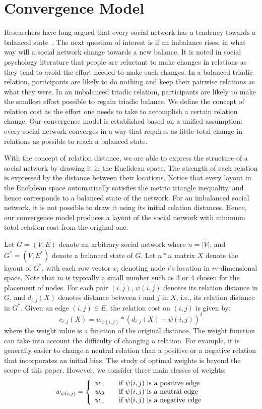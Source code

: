 \documentclass[acmtweb]{acmsmall}
\begin{document}
\section{Convergence Model} \label{sec:mathmodel}
Researchers have long argued that every social network has a tendency
towards a balanced state~\cite{Doreian:02}.  The next question of
interest is if an imbalance rises, in what way will a social network
change towards a new balance.  It is noted in social psychology
literature that people are reluctant to make changes in relations as
they tend to avoid the effort needed to make such changes. In a balanced
triadic relation, participants are likely to do nothing and keep their
pairwise relations as what they were. In an imbalanced triadic
relation, participants are likely to make the smallest effort possible
to regain triadic balance. We define the concept of relation cost as
the effort one needs to take to accomplish a certain relation
change. Our convergence model is established based on a unified
assumption: every social network converges in a way that requires as
little total change in relations as possible to reach a balanced
state.

With the concept of relation distance, we are able to express the
structure of a social network by drawing it in the Euclidean
space. The strength of each relation is expressed by the distance
between their locations. Notice that every layout in the Euclidean
space automatically satisfies the metric triangle inequality, and
hence corresponds to a balanced state of the network.  For an
imbalanced social network, it is not possible to draw it using its
initial relation distances.  Hence, our convergence model produces a
layout of the social network with minimum total relation cost from the
original one.

Let $G=(V,E)$ denote an arbitrary social network where $n=|V|$, and
$G^{*}=(V, E^{*})$ denote a balanced state of $G$. Let $n*n$ matrix
$X$ denote the layout of $G^{*}$, with each row vector $x_{i}$
denoting node $i$'s location in $m$-dimensional space. Note that $m$
is typically a small number such as 3 or 4 chosen for the placement of
nodes. For each pair $(i,j)$, $\psi(i,j)$ denotes its relation
distance in $G$, and $d_{i,j}(X)$ denotes distance between $i$ and $j$
in $X$, i.e., its relation distance in $G^{*}$.  Given an edge
$(i,j)\in E$, the relation cost on $(i,j)$ is given by:
\[c_{i, j}(X)=w_{\psi(i,j)}*(d_{i,j}(X)-\psi{(i,j)})^2\]
where the weight value is a function of the original distance. The
weight function can take into account the difficulty of changing a
relation. For example, it is generally easier to change a neutral
relation than a positive or a negative relation that incorporates an
initial bias. The study of optimal weights is beyond the scope of this
paper. However, we consider three main classes of weights:
\[
 w_{\psi(i,j)}= \left\{ 
  \begin{array}{l l}
    w_{+} & \quad \text{if $\psi(i,j)$ is a positive edge}\\
    w_{O} & \quad \text{if $\psi(i,j)$ is a neutral edge}\\
    w_{-} & \quad \text{if $\psi(i,j)$ is a negative edge}\\
  \end{array} \right.
\]
\end{document}
